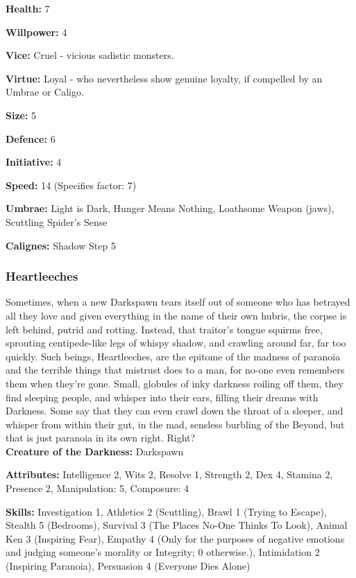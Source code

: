 \noindent \textbf{Health:} 7

\noindent \textbf{Willpower:} 4

\noindent \textbf{Vice:} Cruel - vicious sadistic monsters.

\noindent \textbf{Virtue:} Loyal - who nevertheless show genuine loyalty, if compelled by an Umbrae or Caligo.

\noindent \textbf{Size:} 5

\noindent \textbf{Defence:} 6

\noindent \textbf{Initiative:} 4

\noindent \textbf{Speed:} 14 (Specifies factor: 7)

\noindent \textbf{Umbrae:} Light is Dark, Hunger Means Nothing, Loathsome Weapon (jaws), Scuttling Spider’s Sense

\noindent \textbf{Calignes:}  Shadow Step 5

\subsubsection*{Heartleeches}

Sometimes, when a new Darkspawn tears itself out of someone who has betrayed all they love and given everything in the name of their own hubris, the corpse is left behind, putrid and rotting. Instead, that traitor's tongue squirms free, sprouting centipede-like legs of whispy shadow, and crawling around far, far too quickly. Such beings, Heartleeches, are the epitome of the madness of paranoia and the terrible things that mistrust does to a man, for no-one even remembers them when they're gone. Small, globules of inky darkness roiling off them, they find sleeping people, and whisper into their ears, filling their dreams with Darkness. Some say that they can even crawl down the throat of a sleeper, and whisper from within their gut, in the mad, sensless burbling of the Beyond, but that is just paranoia in its own right. Right?\\

\noindent \textbf{Creature of the Darkness:} Darkspawn

\noindent \textbf{Attributes:} Intelligence 2, Wits 2, Resolve 1, Strength 2, Dex 4, Stamina 2, Presence 2, Manipulation: 5, Composure: 4

\noindent \textbf{Skills:} Investigation 1, Athletics 2 (Scuttling), Brawl 1 (Trying to Escape), Stealth 5 (Bedrooms), Survival 3 (The Places No-One Thinks To Look), Animal Ken 3 (Inspiring Fear), Empathy 4 (Only for the purposes of negative emotions and judging someone's morality or Integrity; 0 otherwise.), Intimidation 2 (Inspiring Paranoia), Persuasion 4 (Everyone Dies Alone)

